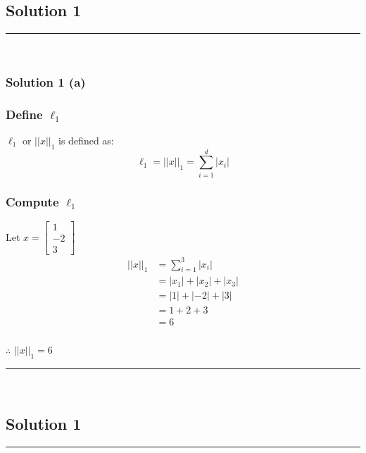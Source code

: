 \documentclass{article}
\begin{document}
\pagestyle{fancy}

\subsection*{Solution 1}
\noindent\rule{\textwidth}{0.4pt}\\

\subsubsection*{Solution 1 (a)}
\subsubsection*{Define $\ell_1$}
\parbox{\textwidth}{
$\ell_1$ or $||x||_1$ is defined as:
$$\ell_{1} = ||x||_1 = \sum_{i=1}^{d} |x_{i}| $$
}
\subsubsection*{Compute $\ell_1$}
\parbox{\textwidth}{
Let $x=\begin{bmatrix} 1 \\ -2 \\ 3 \end{bmatrix}$ \\

\begin{align*}
  ||x||_1 &= \sum_{i=1}^{3} |x_{i}| \\
  &= |x_{1}| + |x_{2}| + |x_{3}| \\
  &= |1| + |-2| + |3| \\
  &= 1 + 2 + 3 \\
  &= 6
\end{align*}
}


\subsubsection*{\normalfont}{$\therefore$ $||x||_{1} = 6$}

\noindent\rule{\textwidth}{0.4pt}\\

\newpage

\subsection*{Solution 1}
\noindent\rule{\textwidth}{0.4pt}\\
\end{document}
